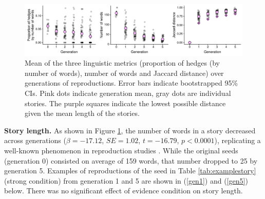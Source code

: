 \documentclass[10pt,letterpaper]{article}
\newcommand{\ek}[1]{\textcolor{Orange}{[ek: #1]}}
\begin{document}
\begin{figure}[]
\centering
	\includegraphics[width=.85\textwidth]{pics/linmeasure_grid}
	\caption{Mean of the three linguistic metrics (proportion of hedges (by number of words), number of words and Jaccard distance) over generations of reproductions. Error bars indicate bootstrapped 95\% CIs. Pink dots indicate generation mean, gray dots are individual stories. The purple squares indicate the lowest possible distance given the mean length of the stories.} 
	\label{fig:corpusLingMetrics}
\end{figure}

\textbf{Story length.} As shown in Figure \ref{fig:corpusLingMetrics}, the number of words in a story decreased across generations ($\beta = -17.12$, $SE = 1.02$, $t = -16.79$, $p < 0.0001$),
replicating a well-known phenomenon in reproduction studies \cite{Bartlett:1932}. While the original seeds (generation 0) consisted on average of 159 words, that number dropped to 25 by generation 5. Examples of reproductions of the seed in Table \ref{tab:examplestory} (strong condition) from generation 1 and 5 are shown in (\ref{gen1}) and (\ref{gen5}) below. There was no significant effect of evidence condition on story length.


\end{document}
